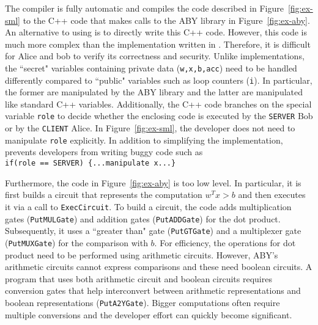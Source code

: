 The \tool compiler is fully automatic and compiles the code described in Figure~\ref{fig:ex-sml} to the C++ code that makes calls to the ABY library  in
Figure~\ref{fig:ex-aby}. An alternative to using \tool is to directly write this C++ code.
However, this code is much more complex than the implementation written in \tool.
Therefore, it is difficult for Alice and bob to verify its correctness and security.
Unlike \tool implementations, the ``secret" variables containing private data ({\tt w,x,b,acc}) need to be handled differently compared to ``public" variables such as loop counters ({\tt i}). In particular, the former are manipulated by the ABY library and the latter are manipulated like standard  C++ variables.
Additionally, the C++ code branches on  the special variable
{\tt role}  to decide whether the enclosing code is executed by the {\tt SERVER} Bob or by
the {\tt CLIENT} Alice. In Figure~\ref{fig:ex-sml}, the developer does not need to
manipulate {\tt role} explicitly. In addition to simplifying the implementation, \tool prevents developers from writing buggy code such as\\
\verb+if(role == SERVER) {...manipulate x...}+

Furthermore, the code in Figure~\ref{fig:ex-aby} is too low level.
In particular, it is first builds a circuit that represents the computation
$w^Tx>b$ and then executes it via a call to {\tt ExecCircuit}.
To build a circuit, the code adds multiplication gates ({\tt PutMULGate})
and addition gates ({\tt PutADDGate}) for the dot product.
Subsequently, it uses a ``greater than" gate ({\tt PutGTGate})
and a multiplexer gate ({\tt PutMUXGate}) for the comparison with $b$.
For efficiency, the operations for dot product need to be performed using 
arithmetic circuits. However, ABY's arithmetic circuits cannot express
comparisons and these need  boolean circuits.
A program that uses both arithmetic circuit and boolean circuits
requires conversion gates that help  interconvert between arithmetic
representations and boolean representations ({\tt PutA2YGate}).
Bigger computations often require multiple conversions and the
developer effort can quickly become significant.

